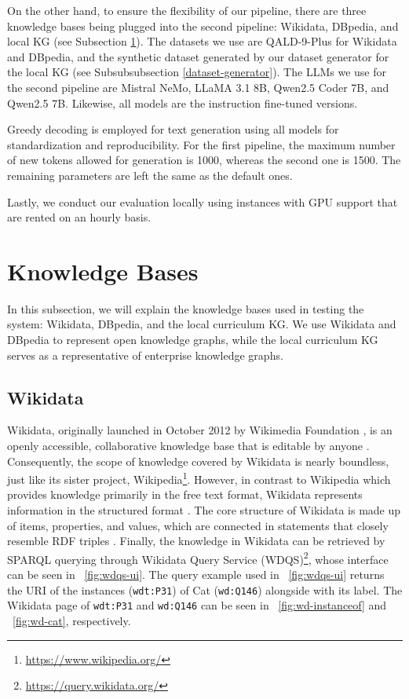 On the other hand, to ensure the flexibility of our pipeline, there are three knowledge bases being plugged into the second pipeline: Wikidata, DBpedia, and local KG (see Subsection \ref{knowledgebase}). The datasets we use are QALD-9-Plus \citep{perevalov2022qald9plus} for Wikidata and DBpedia, and the synthetic dataset generated by our dataset generator for the local KG (see Subsubsubsection \ref{dataset-generator}). The LLMs we use for the second pipeline are Mistral NeMo, LLaMA 3.1 8B, Qwen2.5 Coder 7B, and Qwen2.5 7B. Likewise, all models are the instruction fine-tuned versions.

Greedy decoding is employed for text generation using all models for standardization and reproducibility. For the first pipeline, the maximum number of new tokens allowed for generation is 1000, whereas the second one is 1500. The remaining parameters are left the same as the default ones.

Lastly, we conduct our evaluation locally using instances with GPU support that are rented on an hourly basis.

\section{Knowledge Bases} \label{knowledgebase}
In this subsection, we will explain the knowledge bases used in testing the system: Wikidata, DBpedia, and the local curriculum KG. We use Wikidata and DBpedia to represent open knowledge graphs, while the local curriculum KG serves as a representative of enterprise knowledge graphs.

\subsection{Wikidata}
Wikidata, originally launched in October 2012 by Wikimedia Foundation \citep{vrandevcic2014}, is an openly accessible, collaborative knowledge base that is editable by anyone \citep{waagmeester2020}. Consequently, the scope of knowledge covered by Wikidata is nearly boundless, just like its sister project, Wikipedia\footnote{\url{https://www.wikipedia.org/}}. However, in contrast to Wikipedia which provides knowledge primarily in the free text format, Wikidata represents information in the structured format \citep{waagmeester2020}. The core structure of Wikidata is made up of items, properties, and values, which are connected in statements that closely resemble RDF triples \citep{Cantallops2019ASL}. Finally, the knowledge in Wikidata can be retrieved by SPARQL querying through Wikidata Query Service (WDQS)\footnote{\url{https://query.wikidata.org/}}, whose interface can be seen in \pic~\ref{fig:wdqs-ui}. The query example used in \pic~\ref{fig:wdqs-ui} returns the URI of the instances (\texttt{wdt:P31}) of Cat (\texttt{wd:Q146}) alongside with its label. The Wikidata page of \texttt{wdt:P31} and \texttt{wd:Q146} can be seen in \pic~\ref{fig:wd-instanceof} and \pic~\ref{fig:wd-cat}, respectively.

